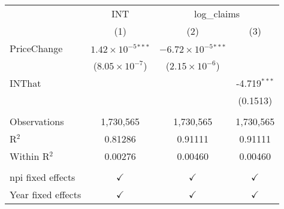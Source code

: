 
\begingroup
\centering
\begin{tabular}{lccc}
   \toprule
    & INT & \multicolumn{2}{c}{log\_claims}\\
                      & (1)                           & (2)                            & (3)\\  
   \midrule 
   PriceChange        & $1.42\times 10^{-5}$$^{***}$  & $-6.72\times 10^{-5}$$^{***}$  &   \\   
                      & ($8.05\times 10^{-7}$)        & ($2.15\times 10^{-6}$)         &   \\   
   INThat             &                               &                                & -4.719$^{***}$\\   
                      &                               &                                & (0.1513)\\   
    \\
   Observations       & 1,730,565                     & 1,730,565                      & 1,730,565\\  
   R$^2$              & 0.81286                       & 0.91111                        & 0.91111\\  
   Within R$^2$       & 0.00276                       & 0.00460                        & 0.00460\\  
    \\
   npi fixed effects  & $\checkmark$                  & $\checkmark$                   & $\checkmark$\\   
   Year fixed effects & $\checkmark$                  & $\checkmark$                   & $\checkmark$\\   
   \bottomrule
\end{tabular}
\par\endgroup


